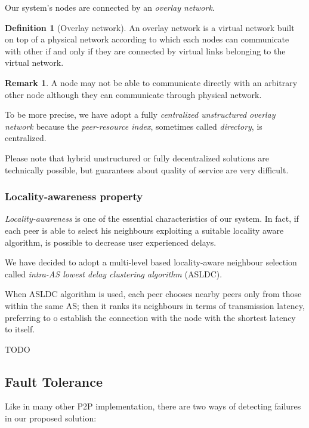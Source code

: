 \documentclass[10pt,a4paper]{article}
\theoremstyle{definition}
\newtheorem{definition}{Definition}[section]
\newtheorem*{remark}{Remark}
\begin{document}
Our system's nodes are connected by an \textit{overlay network}.

\begin{definition}[Overlay network]
An overlay network is a virtual network built on top of a physical network according to which each nodes can communicate with other if and only if they are connected by virtual links belonging to the virtual network. 
\end{definition}

\begin{remark}
A node may not be able to communicate directly with an arbitrary other node although they can communicate through physical network.
\end{remark}

To be more precise, we have adopt a fully \textit{centralized unstructured overlay network} because the \textit{peer-resource index}, sometimes called \textit{directory}, is centralized. 

Please note that hybrid unstructured or fully decentralized solutions are technically possible, but guarantees about quality of service are very difficult.

\subsubsection{Locality-awareness property}

\textit{Locality-awareness} is one of the essential characteristics of our system. In fact, if each peer is able to select his neighbours exploiting a suitable locality aware algorithm, is possible to decrease user experienced delays.

We have decided to adopt a multi-level based locality-aware neighbour selection called \textit{intra-AS lowest delay clustering algorithm} (ASLDC). 

When ASLDC algorithm is used, each peer chooses nearby peers only from those within the same AS; then it ranks its neighbours in terms of transmission latency, preferring to o establish the connection with the node with the shortest latency to itself. 

TODO \cite{UnderstandingLocalityAwareness}

\subsection{Fault Tolerance}

Like in many other P2P implementation, there are two ways of detecting failures in our proposed solution:
\end{document}
